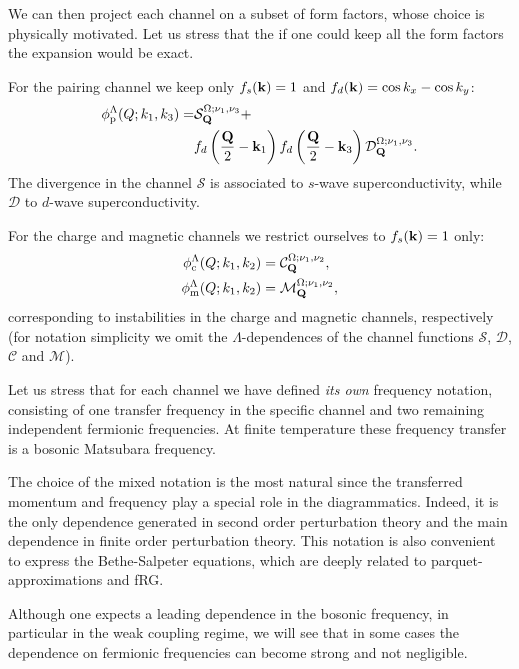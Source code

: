 We can then project each channel on a subset of form factors, whose choice is physically motivated\cite{Husemann2009}. 
Let us stress that the if one could keep all the  form factors the expansion would be exact.

For the pairing channel we keep only $f_{s}(\mathbf{k}) = 1$ and $f_d(\mathbf{k})=\cos{k_x} - \cos{k_y}$:
\begin{align}
\nonumber
  \phi^{\Lambda}_{\mathrm{p}}(Q;k_1,k_3) =&
    \mathcal{S}_{\mathbf{Q}}^{\Omega;\nu_1,\nu_3} +   \\ 
    & f_d\left(\frac{\mathbf{Q}}{2}-\mathbf{k}_1\right) f_d\left(\frac{\mathbf{Q}}{2}-\mathbf{k}_3\right) \mathcal{D}_{\mathbf{Q}}^{\Omega;\nu_1,\nu_3}.
\end{align}
The divergence in the channel $\mathcal{S}$ is associated to $s$-wave superconductivity, while $\mathcal{D}$  to $d$-wave superconductivity.\cite{Metzner2012,Platt2014}

For the charge and magnetic channels we restrict ourselves to $f_{s}(\mathbf{k})=1$ only:
\begin{align}
  \phi^\Lambda_{\mathrm{c}}(Q;k_1,k_2) &= \mathcal{C}_{\mathbf{Q}}^{\Omega;\nu_1,\nu_2}, \\
  \phi^\Lambda_{\mathrm{m}}(Q;k_1,k_2) &= \mathcal{M}_{\mathbf{Q}}^{\Omega;\nu_1,\nu_2},
\end{align}
corresponding to instabilities in the charge and magnetic channels, respectively (for notation simplicity we omit 
the $\Lambda$-dependences of the channel functions $\mathcal{S}$, $\mathcal{D}$, $\mathcal{C}$ and $\mathcal{M}$).

Let us stress that for each channel we have defined \textit{its own} frequency notation, consisting of one transfer frequency in the specific channel 
and two remaining independent fermionic frequencies. 
 At finite temperature these frequency transfer is a bosonic Matsubara frequency.

\noindent
The choice of the mixed notation is the most natural\cite{Wentzell2017} since the transferred momentum and 
frequency play a special role in the diagrammatics.
Indeed, it is the only dependence generated in second order perturbation theory and the main dependence in finite 
order perturbation theory. This notation is also convenient to express the Bethe-Salpeter equations\cite{Rohringer2012}, which are deeply related to parquet-approximations and fRG. 

Although one expects a leading dependence in the bosonic frequency, 
in particular in the weak coupling regime, we will see that in some cases the dependence on fermionic frequencies can become strong and not negligible.

